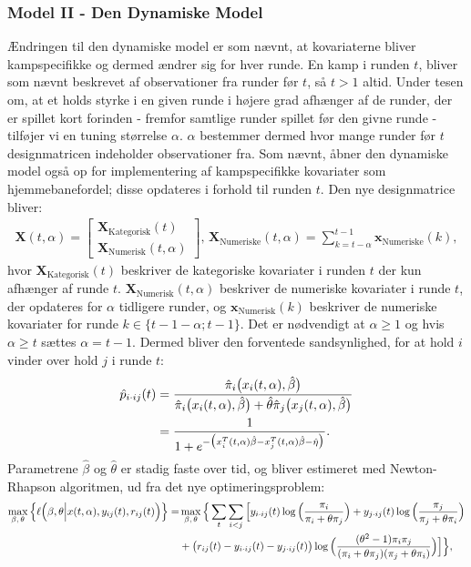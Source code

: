 \documentclass[11pt,a4paper]{article}
\begin{document}
\subsubsection{Model II - Den Dynamiske Model}
Ændringen til den dynamiske model er som nævnt, at kovariaterne bliver kampspecifikke og dermed ændrer sig for hver runde. En kamp i runden $t$, bliver som nævnt beskrevet af observationer fra runder før $t$, så $t>1$ altid. Under tesen om, at et holds styrke i en given runde i højere grad afhænger af de runder, der er spillet kort forinden - fremfor samtlige runder spillet før den givne runde - tilføjer vi en tuning størrelse $\alpha$. $\alpha$ bestemmer dermed hvor mange runder før $t$ designmatricen indeholder observationer fra. Som nævnt, åbner den dynamiske model også op for implementering af kampspecifikke kovariater som hjemmebanefordel; disse opdateres i forhold til runden $t$. Den nye designmatrice bliver:
\begin{align*}
\textbf{X}(t,\alpha)=\begin{bmatrix}
\textbf{X}_{\text{Kategorisk}}(t)\\
\textbf{X}_{\text{Numerisk}}(t,\alpha)
\end{bmatrix}\text{,   }\textbf{X}_{\text{Numeriske}}(t,\alpha)=\sum_{k=t-\alpha}^{t-1}\textbf{x}_{\text{Numeriske}}(k),
\end{align*}
hvor $\textbf{X}_{\text{Kategorisk}}(t)$ beskriver de kategoriske kovariater i runden $t$ der kun afhænger af runde $t$. $\textbf{X}_{\text{Numerisk}}(t,\alpha)$ beskriver de numeriske kovariater i runde $t$, der opdateres for $\alpha$ tidligere runder, og $\textbf{x}_{\text{Numerisk}}(k)$ beskriver de numeriske kovariater for runde $k\in \{t-1-\alpha;t-1\}$. Det er nødvendigt at $\alpha\geq1$ og hvis $\alpha\geq t$ sættes $\alpha=t-1$.
Dermed bliver den forventede sandsynlighed, for at hold $i$ vinder over hold $j$ i runde $t$:
\begin{align*}
\hat{p}_{i\cdot ij}(t) &=\frac{\hat{\pi}_i\big{(}x_i(t,\alpha),\hat{\beta}\big{)}}{\hat{\pi}_i\big{(}x_i(t,\alpha),\hat{\beta}\big{)}+\hat{\theta}\hat{\pi}_j\big{(}x_j(t,\alpha),\hat{\beta}\big{)}}\\
&=\frac{1}{1+e^{-\big{(}x_i^T(t,\alpha)\hat{\beta}-x_j^T(t,\alpha)\hat{\beta}-\hat{\eta}\big{)}}}.
\end{align*}
Parametrene $\hat{\beta}$ og $\hat{\theta}$ er stadig faste over tid, og bliver estimeret med Newton-Rhapson algoritmen, ud fra det nye optimeringsproblem:
\begin{align*}
\max_{\beta,\,\theta} \Big{\{}\ell\Big{(}\beta,\theta\Big{|}x(t,\alpha),y_{ij}(t),r_{ij}(t)\Big{)}\Big{\}}=&\max_{\beta,\,\theta} \Big{\{} \sum_{t}\sum_{i<j}\Big{[}y_{i\cdot ij}(t)\log\Big{(}\frac{\pi_i}{\pi_i+\theta\pi_j}\Big{)}
+ y_{j\cdot ij}(t)\log\Big{(}\frac{\pi_j}{\pi_j+\theta\pi_i}\Big{)}\\
&+ \big{(}r_{ij}(t)-y_{i\cdot ij}(t)-y_{j\cdot ij}(t)\big{)} \log\Big{(}\frac{(\theta^2-1)\pi_i \pi_j}{(\pi_i+\theta\pi_j)(\pi_j+\theta\pi_i)}\Big{)}\Big{]}\Big{\}},
\end{align*}
\end{document}
